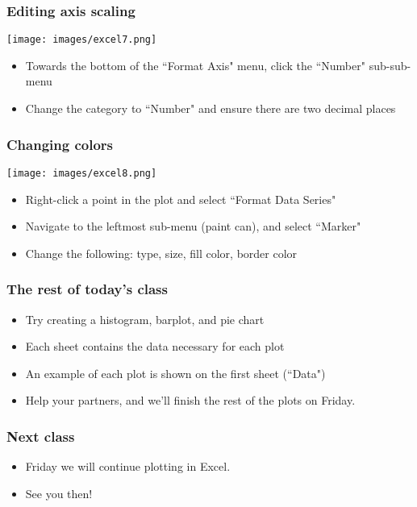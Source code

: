 \documentclass[11pt]{beamer}
\begin{document}
\begin{frame}
\frametitle{Editing axis scaling}
\begin{center}
	\texttt{[image: images/excel7.png]} 
\end{center}
\begin{itemize}
	\item Towards the bottom of the ``Format Axis" menu, click the ``Number" sub-sub-menu \pause
	\item Change the category to ``Number" and ensure there are two decimal places 
\end{itemize}
\end{frame}

\begin{frame}
\frametitle{Changing colors}
\begin{center}
	\texttt{[image: images/excel8.png]} 
\end{center}
\begin{itemize}
	\item Right-click a point in the plot and select ``Format Data Series" \pause
	\item Navigate to the leftmost sub-menu (paint can), and select ``Marker" \pause
	\item Change the following: type, size, fill color, border color
\end{itemize}
\end{frame}

\begin{frame}
\frametitle{The rest of today's class}
\begin{itemize} \itemsep1em
	\item Try creating a histogram, barplot, and pie chart \pause
	\item Each sheet contains the data necessary for each plot \pause 
	\item An example of each plot is shown on the first sheet (``Data") \pause
	\item Help your partners, and we'll finish the rest of the plots on Friday.
\end{itemize}
\end{frame}

\begin{frame}
\frametitle{Next class}
\begin{itemize} \itemsep1em
	\item[] Friday we will continue plotting in Excel. 
	\item[] See you then!
\end{itemize}
\end{frame}
\end{document}
